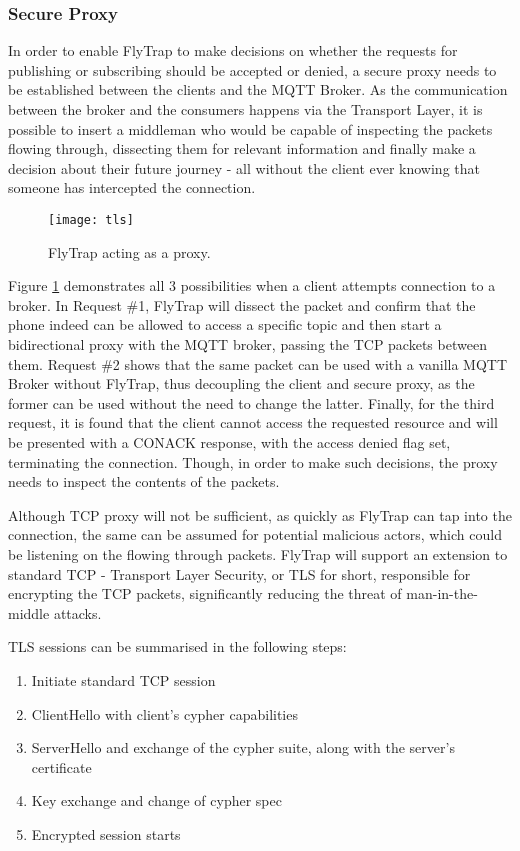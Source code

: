 \subsubsection{Secure Proxy}
In order to enable FlyTrap to make decisions on whether the requests for publishing or subscribing should be accepted or denied, a secure proxy needs to be established between the clients and the MQTT Broker. As the communication between the broker and the consumers happens via the Transport Layer, it is possible to insert a middleman who would be capable of inspecting the packets flowing through, dissecting them for relevant information and finally make a decision about their future journey - all without the client ever knowing that someone has intercepted the connection. 

\begin{figure}[h]
    \centering
    \texttt{[image: tls]}
    \caption{FlyTrap acting as a proxy.}
    \label{fig:tls}
\end{figure}

Figure \ref{fig:tls} demonstrates all 3 possibilities when a client attempts connection to a broker. In Request \#1, FlyTrap will dissect the packet and confirm that the phone indeed can be allowed to access a specific topic and then start a bidirectional proxy with the MQTT broker, passing the TCP packets between them. Request \#2 shows that the same packet can be used with a vanilla MQTT Broker without FlyTrap, thus decoupling the client and secure proxy, as the former can be used without the need to change the latter. Finally, for the third request, it is found that the client cannot access the requested resource and will be presented with a CONACK response, with the access denied flag set, terminating the connection. Though, in order to make such decisions, the proxy needs to inspect the contents of the packets.

Although TCP proxy will not be sufficient, as quickly as FlyTrap can tap into the connection, the same can be assumed for potential malicious actors, which could be listening on the flowing through packets. FlyTrap will support an extension to standard TCP - Transport Layer Security, or TLS for short, responsible for encrypting the TCP packets, significantly reducing the threat of man-in-the-middle attacks.

TLS sessions can be summarised in the following steps:
\begin{enumerate}
\item Initiate standard TCP session
\item ClientHello with client's cypher capabilities 
\item ServerHello and exchange of the cypher suite, along with the server's certificate
\item Key exchange and change of cypher spec
\item Encrypted session starts
\end{enumerate}

